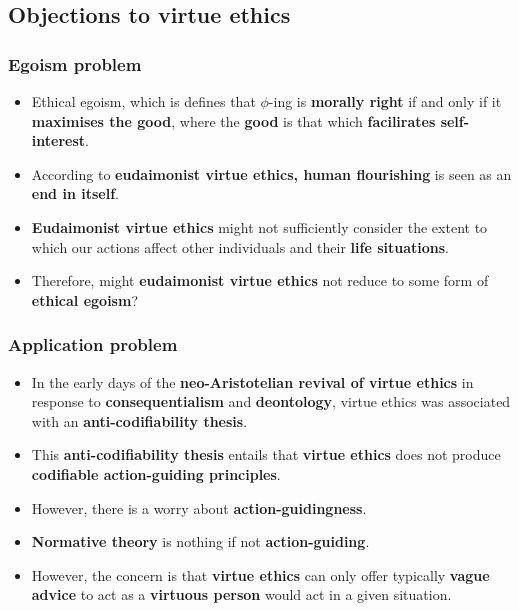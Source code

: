 \documentclass[11pt]{article}
\begin{document}
\subsection{Objections to virtue ethics}
\label{sec:org1b4d5a9}

\subsubsection{Egoism problem}
\label{sec:orgaf46889}
\begin{itemize}
\item Ethical egoism, which is defines that \(\phi\)-ing is \textbf{morally right} if and only if it \textbf{maximises the good}, where the \textbf{good} is that which \textbf{facilirates self-interest}.
\item According to \textbf{eudaimonist virtue ethics, human flourishing} is seen as an \textbf{end in itself}.
\item \textbf{Eudaimonist virtue ethics} might not sufficiently consider the extent to which our actions affect other individuals and their \textbf{life situations}.
\item Therefore, might \textbf{eudaimonist virtue ethics} not reduce to some form of \textbf{ethical egoism}?
\end{itemize}
\subsubsection{Application problem}
\label{sec:org8bd90e9}
\begin{itemize}
\item In the early days of the \textbf{neo-Aristotelian revival of virtue ethics} in response to \textbf{consequentialism} and \textbf{deontology}, virtue ethics was associated with an \textbf{anti-codifiability thesis}.
\item This \textbf{anti-codifiability thesis} entails that \textbf{virtue ethics} does not produce \textbf{codifiable action-guiding principles}.
\item However, there is a worry about \textbf{action-guidingness}.
\item \textbf{Normative theory} is nothing if not \textbf{action-guiding}.
\item However, the concern is that \textbf{virtue ethics} can only offer typically \textbf{vague advice} to act as a \textbf{virtuous person} would act in a given situation.
\end{itemize}

 \newpage
\end{document}
